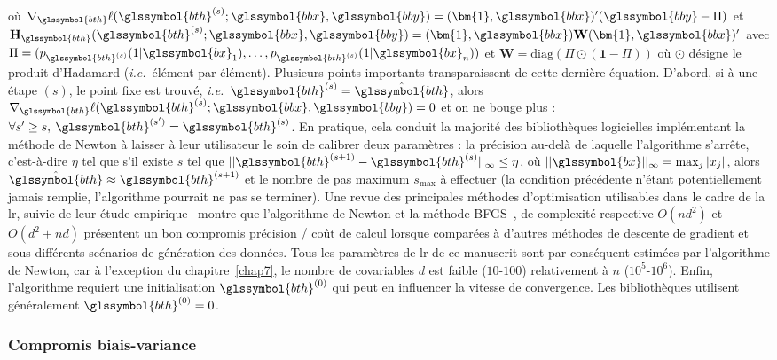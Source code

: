 où $ \nabla_{\glssymbol{bth}} \ell(\glssymbol{bth}^{(s)};\glssymbol{bbx},\glssymbol{bby}) = (\bm{1},\glssymbol{bbx})' (\glssymbol{bby} - \Pi)$ et $\mathbf{H}_{{\glssymbol{bth}}}(\glssymbol{bth}^{(s)};\glssymbol{bbx},\glssymbol{bby}) = (\bm{1},\glssymbol{bbx}) \mathbf{W} (\bm{1},\glssymbol{bbx})'$ avec $\Pi = (p_{\glssymbol{bth}^{(s)}}(1|\glssymbol{bx}_1),\dots,p_{\glssymbol{bth}^{(s)}}(1|\glssymbol{bx}_n))$ et $\mathbf{W} = \text{diag}(\Pi \odot (\bm{1}-\Pi))$ où $\odot$ désigne le produit d'Hadamard (\textit{i.e.}\ élément par élément). Plusieurs points importants transparaissent de cette dernière équation. D'abord, si à une étape $(s)$, le point fixe est trouvé, \textit{i.e.}\ $\glssymbol{bth}^{(s)} = \hat{\glssymbol{bth}}$, alors $\nabla_{\glssymbol{bth}} \ell(\glssymbol{bth}^{(s)};\glssymbol{bbx},\glssymbol{bby}) = 0$ et on ne bouge plus : $\forall s' \geq s, \: \glssymbol{bth}^{(s')} = \glssymbol{bth}^{(s)}$. En pratique, cela conduit la majorité des bibliothèques logicielles implémentant la méthode de Newton à laisser à leur utilisateur le soin de calibrer deux paramètres : la précision au-delà de laquelle l'algorithme s'arrête, c'est-à-dire $\eta$ tel que s'il existe $s$ tel que $||\glssymbol{bth}^{(s+1)} - \glssymbol{bth}^{(s)}||_{\infty} \leq \eta$, où $|| \glssymbol{bx} ||_{\infty} = \max_{j} |x_j|$, alors $\hat{\glssymbol{bth}} \approx \glssymbol{bth}^{(s+1)}$ et le nombre de pas maximum $s_{\text{max}}$ à effectuer (la condition précédente n'étant potentiellement jamais remplie, l'algorithme pourrait ne pas se terminer). Une revue des principales méthodes d'optimisation utilisables dans le cadre de la \gls{lr}, suivie de leur étude empirique~\cite{minka2003comparison} montre que l'algorithme de Newton et la méthode BFGS~\cite{byrd1995limited}, de complexité respective $O(nd^2)$ et $O(d^2 + nd)$ présentent un bon compromis précision / coût de calcul lorsque comparées à d'autres méthodes de descente de gradient et sous différents scénarios de génération des données. Tous les paramètres de \gls{lr} de ce manuscrit sont par conséquent estimées par l'algorithme de Newton, car à l'exception du chapitre~\ref{chap7}, le nombre de covariables $d$ est faible ($10$-$100$) relativement à $n$ ($10^5$-$10^6$). Enfin, l'algorithme requiert une initialisation $\glssymbol{bth}^{(0)}$ qui peut en influencer la vitesse de convergence. Les bibliothèques utilisent généralement $\glssymbol{bth}^{(0)}=0$.

\subsubsection{Compromis biais-variance}

